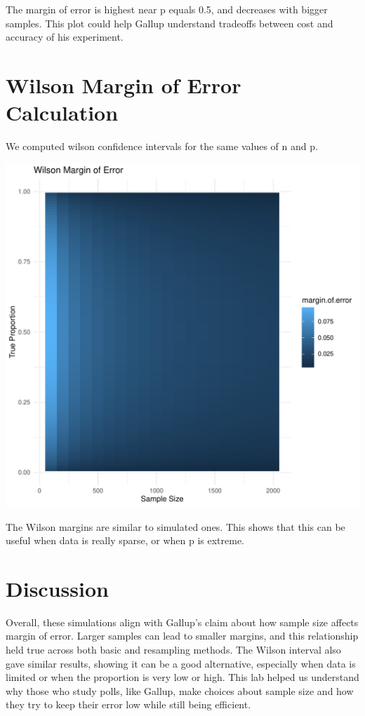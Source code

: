 \documentclass{article}\usepackage[]{graphicx}\usepackage[]{xcolor}
\newenvironment{Figure}
  {\par\medskip\noindent\minipage{\linewidth}}
  {\endminipage\par\medskip}
\begin{document}
\begin{multicols}{2}
The margin of error is highest near p equals 0.5, and decreases with bigger samples. This plot could help Gallup understand tradeoffs between cost and accuracy of his experiment. 

\section{Wilson Margin of Error Calculation}
We computed wilson confidence intervals for the same values of n and p.

\begin{Figure}
\includegraphics[width=\linewidth]{plot 5.pdf}
\end{Figure}

The Wilson margins are similar to simulated ones. This shows that this can be useful when data is really sparse, or when p is extreme. 


\section{Discussion}
Overall, these simulations align with Gallup’s claim about how sample size affects margin of error. Larger samples can lead to smaller margins, and this relationship held true across both basic and resampling methods. The Wilson interval also gave similar results, showing it can be a good alternative, especially when data is limited or when the proportion is very low or high. This lab helped us understand why those who study polls, like Gallup, make choices about sample size and how they try to keep their error low while still being efficient.


\end{multicols}
\end{document}

